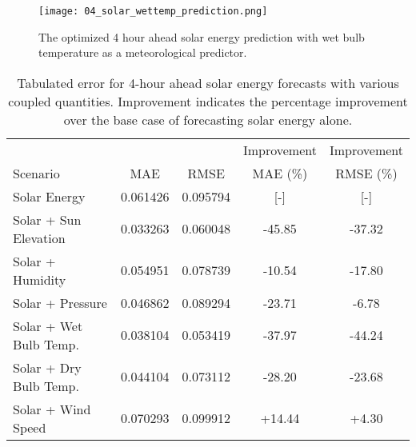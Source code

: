 \begin{figure*}[ht]
  \centering
  \texttt{[image: 04\_solar\_wettemp\_prediction.png]}
  \caption{The optimized 4 hour ahead solar energy prediction with wet bulb
  temperature as a meteorological predictor.}
  \label{fig:wind04}
\end{figure*}
  \begin{table*}[ht]
    \centering
    \caption{Tabulated error for 4-hour ahead solar energy forecasts with various coupled quantities. Improvement indicates the percentage improvement over the base case of forecasting solar energy alone.}
    \label{tab:solar04}
    \begin{tabular}{l|c|c|c|c}
      &  & & Improvement & Improvement \\
      Scenario  & MAE & RMSE & MAE (\%) & RMSE (\%)\\
      \hline
      Solar Energy & 0.061426 & 0.095794 & [-] & [-] \\
      Solar + Sun Elevation & 0.033263 & 0.060048 & -45.85 & -37.32\\
      Solar + Humidity & 0.054951 & 0.078739 & -10.54& -17.80\\
      Solar + Pressure & 0.046862 & 0.089294 & -23.71& -6.78\\
      Solar + Wet Bulb Temp. & 0.038104 & 0.053419 & -37.97& -44.24\\
      Solar + Dry Bulb Temp. & 0.044104 & 0.073112 & -28.20& -23.68\\
      Solar + Wind Speed & 0.070293 & 0.099912 & +14.44& +4.30\\
    \end{tabular}
  \end{table*}
